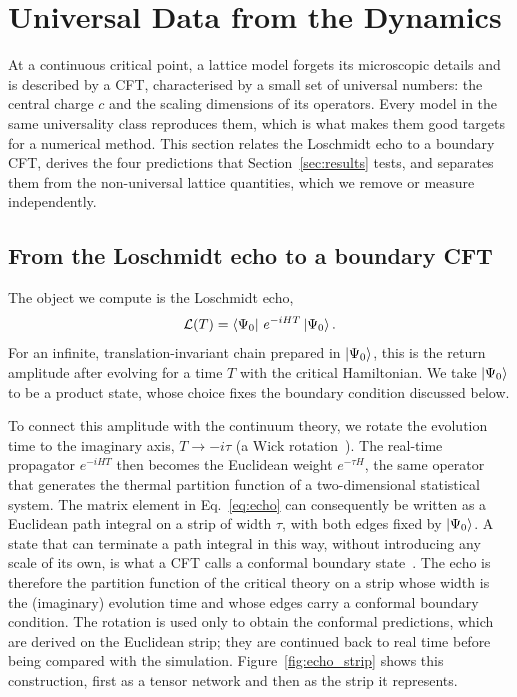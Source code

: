 \FloatBarrier
\section{Universal Data from the Dynamics}
\label{sec:cft}

At a continuous critical point, a lattice model forgets its microscopic details and is described by a \ac{CFT}, characterised by a small set of universal numbers: the central charge $c$ and the scaling dimensions of its operators. Every model in the same universality class reproduces them, which is what makes them good targets for a numerical method. This section relates the Loschmidt echo to a boundary \ac{CFT}, derives the four predictions that Section~\ref{sec:results} tests, and separates them from the non-universal lattice quantities, which we remove or measure independently.

\subsection{From the Loschmidt echo to a boundary CFT}
\label{sec:cft:boundary}

The object we compute is the Loschmidt echo,
\begin{equation}
  \mathcal{L}(T) = \bra{\Psi_0}\, e^{-iHT} \ket{\Psi_0}.
  \label{eq:echo}
\end{equation}
For an infinite, translation-invariant chain prepared in $\ket{\Psi_0}$, this is the return amplitude after evolving for a time $T$ with the critical Hamiltonian. We take $\ket{\Psi_0}$ to be a product state, whose choice fixes the boundary condition discussed below.

To connect this amplitude with the continuum theory, we rotate the evolution time to the imaginary axis, $T\to-i\tau$ (a Wick rotation~\cite{wick1954}). The real-time propagator $e^{-iHT}$ then becomes the Euclidean weight $e^{-\tau H}$, the same operator that generates the thermal partition function of a two-dimensional statistical system. The matrix element in Eq.~\eqref{eq:echo} can consequently be written as a Euclidean path integral on a strip of width $\tau$, with both edges fixed by $\ket{\Psi_0}$. A state that can terminate a path integral in this way, without introducing any scale of its own, is what a \ac{CFT} calls a conformal boundary state~\cite{cardy1989}. The echo is therefore the partition function of the critical theory on a strip whose width is the (imaginary) evolution time and whose edges carry a conformal boundary condition. The rotation is used only to obtain the conformal predictions, which are derived on the Euclidean strip; they are continued back to real time before being compared with the simulation. Figure~\ref{fig:echo_strip} shows this construction, first as a tensor network and then as the strip it represents.

